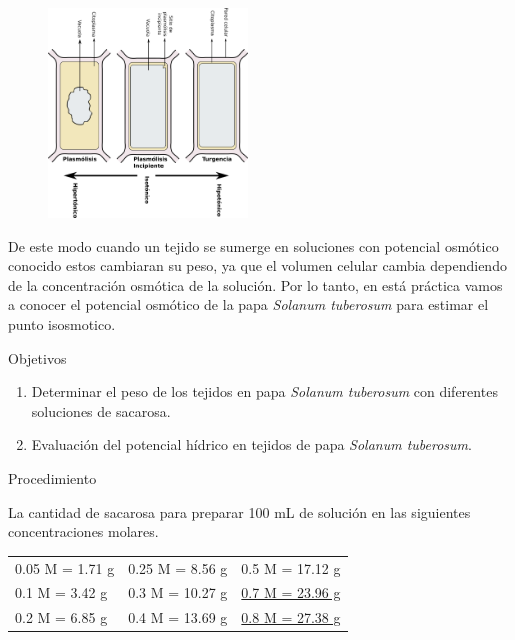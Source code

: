 \documentclass[12pt, aspectratio=169]{beamer}
\begin{document}
	\begin{frame}
		\begin{figure}
			\includegraphics[width=200px]{Plasmolisis}
			\centering
		\end{figure}
	\end{frame}

	\begin{frame}
		De este modo cuando un tejido se sumerge en soluciones con potencial osm\'otico conocido estos cambiaran su peso, ya que el volumen celular cambia dependiendo de la concentraci\'on osm\'otica de la soluci\'on. Por lo tanto, en est\'a pr\'actica vamos a conocer el potencial osm\'otico de la papa \textit{Solanum tuberosum} para estimar el punto isosmotico.
	\end{frame}

	\begin{frame}{Objetivos}
		\begin{enumerate}
				
			\item Determinar el peso de los tejidos en papa \textit{Solanum tuberosum} con diferentes soluciones de sacarosa. 
				
			\item Evaluaci\'on del potencial h\'idrico en tejidos de papa \textit{Solanum tuberosum}.
			
		\end{enumerate}
	
	\end{frame}

	\begin{frame}{Procedimiento}
		
		La cantidad de sacarosa para preparar 100 mL de soluci\'on en las siguientes concentraciones molares.
		
		\begin{tabular}{p{}p{}p{0.33\textwidth}}
			0.05 M = 1.71 g  &  0.25 M = 8.56 g & 0.5 M = 17.12 g \\
			0.1 M = 3.42 g & 0.3 M = 10.27 g & \underline{0.7 M = 23.96 g} \\
			0.2 M = 6.85 g & 0.4 M = 13.69 g & \underline{0.8 M = 27.38 g}
		\end{tabular}
		
	\end{frame}
\end{document}
